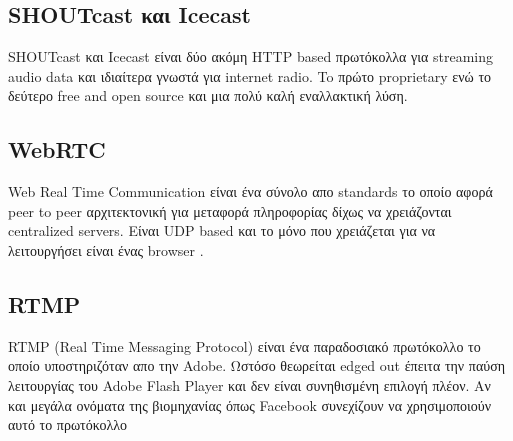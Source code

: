 \documentclass[hidelinks, 12pt, a4paper]{article}
\begin{document}
\subsection{SHOUTcast και Icecast}

SHOUTcast και Icecast είναι δύο ακόμη HTTP based πρωτόκολλα για streaming audio data και ιδιαίτερα γνωστά για internet radio. To πρώτο proprietary ενώ το δεύτερο free and open source και μια πολύ καλή εναλλακτική λύση.

\subsection{WebRTC}

Web Real Time Communication είναι ένα σύνολο απο standards το οποίο αφορά peer to peer αρχιτεκτονική για μεταφορά πληροφορίας δίχως να χρειάζονται centralized servers. Είναι UDP based και το μόνο που χρειάζεται για να λειτουργήσει είναι ένας browser \cite{webrtc}.

\subsection{RTMP}

RTMP (Real Time Messaging Protocol) είναι ένα παραδοσιακό πρωτόκολλο το οποίο υποστηριζόταν απο την Adobe. Ωστόσο θεωρείται edged out έπειτα την παύση λειτουργίας του Adobe Flash Player και δεν είναι συνηθισμένη επιλογή πλέον. Αν και μεγάλα ονόματα της βιομηχανίας όπως Facebook συνεχίζουν να χρησιμοποιούν αυτό το πρωτόκολλο \cite{streamingmedia}


\clearpage



\end{document}
